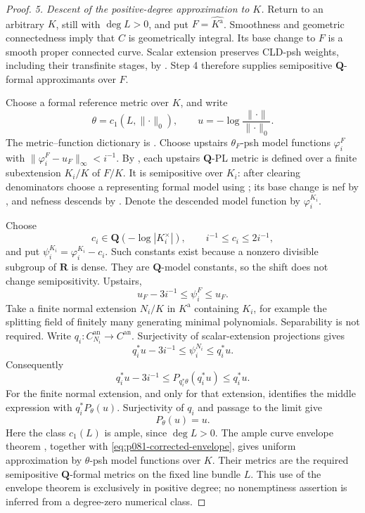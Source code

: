 \begin{proof}
\emph{5. Descent of the positive-degree approximation to $K$.}
Return to an arbitrary $K$, still with $\deg L>0$, and put
$F=\widehat{K^{\mathrm a}}$.  Smoothness and geometric connectedness
imply that $C$ is geometrically integral.  Its base change to $F$
is a smooth proper connected curve.  Scalar extension preserves
CLD-psh weights, including their transfinite stages, by
\cite[Proposition~8.1.5 and \S11.1.9]{CLD25}.  Step 4 therefore supplies
semipositive $\mathbf Q$-formal approximants over $F$.

Choose a formal reference metric over $K$, and write
\[
 \theta=c_1(L,\lVert\cdot\rVert_0),\qquad
 u=-\log\frac{\lVert\cdot\rVert}{\lVert\cdot\rVert_0}.
\]
The metric--function dictionary is \cite[\S4.7]{GM19}.  Choose upstairs
$\theta_F$-psh model functions $\varphi_i^F$ with
$\|\varphi_i^F-u_F\|_\infty<i^{-1}$.
By \cite[Proposition~2.18(b)]{GM19}, each upstairs
$\mathbf Q$-PL metric is defined over a finite subextension
$K_i/K$ of $F/K$.  It is semipositive over $K_i$: after clearing
denominators choose a representing formal model using
\cite[Proposition~2.10]{GM19}; its base change is nef by
\cite[Proposition~3.5]{GM19}, and nefness descends by
\cite[Lemma~3.3]{GM19}.  Denote the descended model function by
$\varphi_i^{K_i}$.

Choose
\[
 c_i\in\mathbf Q(-\log|K_i^\times|),\qquad
                     i^{-1}\leq c_i\leq2i^{-1},
\]
and put $\psi_i^{K_i}=\varphi_i^{K_i}-c_i$.  Such constants exist
because a nonzero divisible subgroup of $\mathbf R$ is dense.
They are $\mathbf Q$-model constants, so the shift does not change
semipositivity.  Upstairs,
\[
                         u_F-3i^{-1}\leq\psi_i^F\leq u_F.
\]
Take a finite normal extension $N_i/K$ in $K^{\mathrm a}$
containing $K_i$, for example the splitting field of finitely many
generating minimal polynomials.  Separability is not required.
Write $q_i:C_{N_i}^{\mathrm{an}}\to C^{\mathrm{an}}$.
Surjectivity of scalar-extension projections
\cite[\S11.1.9]{CLD25} gives
\[
 q_i^*u-3i^{-1}\leq\psi_i^{N_i}\leq q_i^*u.
\]
Consequently
\[
 q_i^*u-3i^{-1}
 \leq P_{q_i^*\theta}(q_i^*u)\leq q_i^*u.
\]
For the finite normal extension, and only for that extension,
\cite[Proposition~2.11]{GJKM19} identifies the middle expression with
$q_i^*P_\theta(u)$.  Surjectivity of $q_i$ and passage to the limit
give
\begin{equation}
\label{eq:p081-corrected-envelope}
                              P_\theta(u)=u.
\end{equation}
Here the class $c_1(L)$ is ample, since $\deg L>0$.
The ample curve envelope theorem
\cite[Theorem~1.1 and Proposition~2.9(viii)]{GJKM19}, together with
\eqref{eq:p081-corrected-envelope}, gives uniform approximation by
$\theta$-psh model functions over $K$.  Their metrics are the
required semipositive $\mathbf Q$-formal metrics on the fixed
line bundle $L$.  This use of the envelope theorem is exclusively in
positive degree; no nonemptiness assertion is inferred from a
degree-zero numerical class.


\end{proof}
